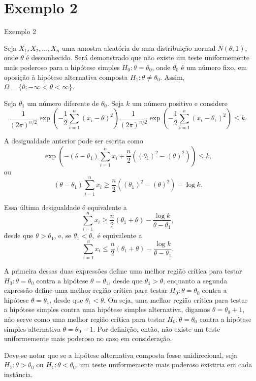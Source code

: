 \documentclass[12pt]{beamer}
\begin{document}
\section{Exemplo 2}
\begin{frame}{Exemplo 2}
\begin{block}{}
\justifying
Seja $X_1, X_2, \ldots, X_n$ uma amostra aleatória de uma distribuição normal $N(\theta, 1)$, onde $\theta$ é desconhecido. Será demonstrado que não existe um teste uniformemente mais poderoso para a hipótese simples $H_0 : \theta = \theta_0$, onde $\theta_0$ é um número fixo, em oposição à hipótese alternativa composta $H_1 : \theta \neq \theta_0$. Assim, $\Omega = \{\theta : -\infty < \theta < \infty\}$.

Seja $\theta_1$ um número diferente de $\theta_0$. Seja $k$ um número positivo e considere
\[
\frac{1}{(2\pi)^{n/2}} \exp\left(-\frac{1}{2}\sum_{i=1}^{n}(x_i - \theta)^2\right) \frac{1}{(2\pi)^{n/2}} \exp\left(-\frac{1}{2}\sum_{i=1}^{n}(x_i - \theta_1)^2\right) \leq k.
\]
\end{block}
\end{frame}

\begin{frame}{}
\vspace{-0.2cm}
\begin{block}{}
\justifying
A desigualdade anterior pode ser escrita como
\[
\exp\left(-( \theta - \theta_1)\sum_{i=1}^{n}x_i + \frac{n}{2}((\theta_1)^2 - (\theta)^2)\right) \leq k,
\]
ou
\[
(\theta - \theta_1)\sum_{i=1}^{n}x_i \geq \frac{n}{2}((\theta_1)^2 - (\theta)^2) - \log k.
\]

Essa última desigualdade é equivalente a
\[
\sum_{i=1}^{n}x_i \geq \frac{n}{2}(\theta_1 + \theta) - \frac{\log k}{\theta - \theta_1},
\]
desde que $\theta > \theta_1$, e,  se $\theta_1 < \theta,$ é equivalente a
\[
\sum_{i=1}^{n}x_i \leq \frac{n}{2}(\theta_1 + \theta) - \frac{\log k}{\theta - \theta_1}.
\] 
\end{block}
\end{frame}

\begin{frame}{}
\begin{block}{}
\justifying
A primeira dessas duas expressões define uma melhor região crítica para testar $H_0 : \theta = \theta_0$ contra a hipótese $\theta = \theta_1$, desde que $\theta_1 > \theta$, enquanto a segunda expressão define uma melhor região crítica para testar $H_0 : \theta = \theta_0$ contra a hipótese $\theta = \theta_1$, desde que $\theta_1 < \theta$. Ou seja, uma melhor região crítica para testar a hipótese simples contra uma hipótese simples alternativa, digamos $\theta = \theta_0 + 1$, não serve como uma melhor região crítica para testar $H_0 : \theta = \theta_0$ contra a hipótese simples alternativa $\theta = \theta_0 - 1$. Por definição, então, não existe um teste uniformemente mais poderoso no caso em consideração.

Deve-se notar que se a hipótese alternativa composta fosse unidirecional, seja $H_1 : \theta > \theta_0$ ou $H_1 : \theta < \theta_0$, um teste uniformemente mais poderoso existiria em cada instância.
\end{block}
\end{frame}
\end{document}
